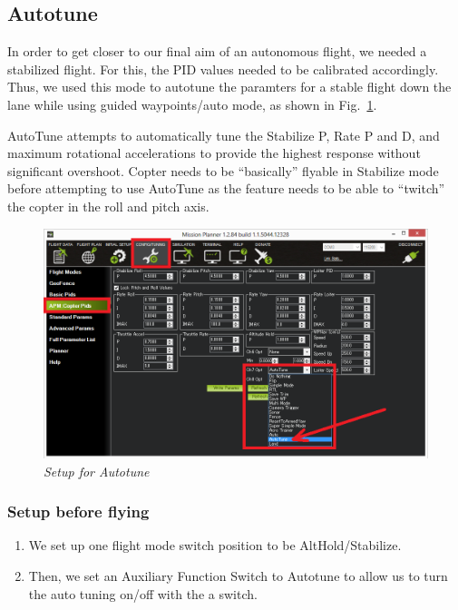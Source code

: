 \subsection{Autotune}

In order to get closer to our final aim of an autonomous flight, we needed a stabilized flight. For this, the PID values needed to be calibrated accordingly. Thus, we used this mode to autotune the paramters for a stable flight down the lane while using guided waypoints/auto mode, as shown in Fig.~\ref{fig: AutoTuneCh7Switch}.

AutoTune attempts to automatically tune the Stabilize P, Rate P and D, and maximum rotational accelerations to provide the highest response without significant overshoot. Copter needs to be “basically” flyable in Stabilize mode before attempting to use AutoTune as the feature needs to be able to “twitch” the copter in the roll and pitch axis.
\begin{figure}[h]
	\includegraphics[width=1.0\linewidth]{AutoTuneCh7Switch}
	\centering
	\caption{\label{fig: AutoTuneCh7Switch}\textit{Setup for Autotune}}
\end{figure}

\subsubsection{Setup before flying}
\begin{enumerate}
	\item We set up one flight mode switch position to be AltHold/Stabilize.
	\item Then, we set an Auxiliary Function Switch to Autotune to allow us to turn the auto tuning on/off with the a switch.
\end{enumerate}
